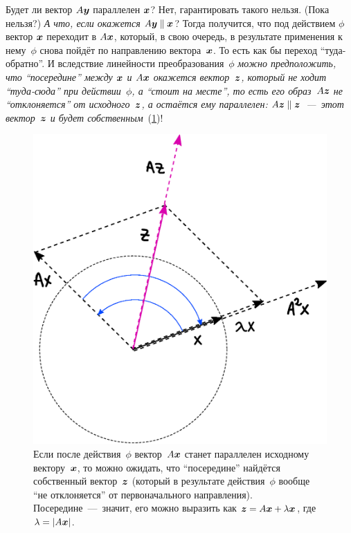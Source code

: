 \documentclass[a4paper,12pt]{article}
\theoremstyle{remark}
\begin{document}
  Будет ли вектор $A \boldsymbol y$ параллелен $\boldsymbol x$?
  Нет, гарантировать такого нельзя.
  (Пока нельзя?)
  \emph{А что, если окажется $A \bds y \hm\parallel \bds x$}?
  Тогда получится, что под действием $\phi$ вектор $\boldsymbol x$ переходит в $A \boldsymbol x$, который, в свою очередь, в результате применения к нему~$\phi$ снова пойдёт по направлению вектора~$\boldsymbol x$.
  То есть как бы переход ``туда-обратно''.
  И вследствие линейности преобразования~$\phi$ \emph{можно предположить, что ``посередине'' между $\boldsymbol x$ и $A \boldsymbol x$ окажется вектор~$\boldsymbol z$, который не ходит ``туда-сюда'' при действии~$\phi$, а ``стоит на месте'', то есть его образ~$A \boldsymbol z$ не ``отклоняется'' от исходного~$\boldsymbol z$, а остаётся ему параллелен: $A \bds z \hm\parallel \bds z$~---~этот вектор~$\boldsymbol z$ и будет собственным}~(\ref{fig:self-adjo-eigen-here-you-are})!
  
  \begin{figure}
    \centering
    
    \includegraphics[width=0.56\columnwidth]{self-adjo-eigen-here-you-are}
    
    \caption{Если после действия~$\phi$ вектор~$A \boldsymbol x$ станет параллелен исходному вектору~$\boldsymbol x$, то можно ожидать, что ``посередине'' найдётся собственный вектор~$\boldsymbol z$ (который в результате действия~$\phi$ вообще ``не отклоняется'' от первоначального направления). Посередине~---~значит, его можно выразить как $\bds z \hm= A \bds x \hm+ \lambda \bds x$, где $\lambda \hm= |A \bds x|$.}
    \label{fig:self-adjo-eigen-here-you-are}
  \end{figure}
  
\end{document}
